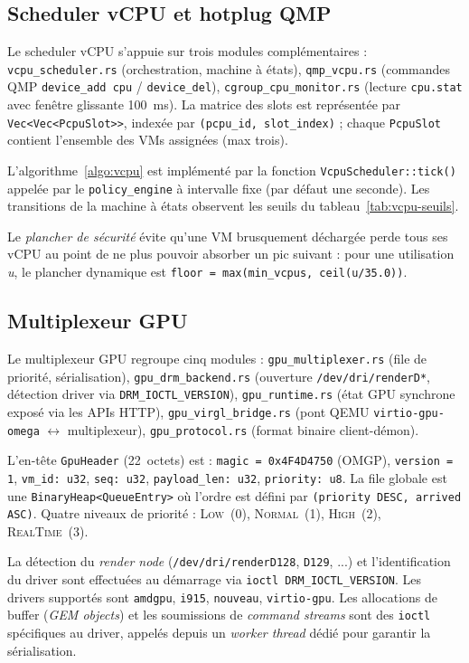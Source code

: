 \subsection{Scheduler vCPU et hotplug QMP}

Le scheduler vCPU s'appuie sur trois modules complémentaires : \texttt{vcpu\_scheduler.rs} (orchestration, machine à états), \texttt{qmp\_vcpu.rs} (commandes QMP \texttt{device\_add cpu} / \texttt{device\_del}), \texttt{cgroup\_cpu\_monitor.rs} (lecture \texttt{cpu.stat} avec fenêtre glissante 100~ms). La matrice des slots est représentée par \texttt{Vec<Vec<PcpuSlot>>}, indexée par \texttt{(pcpu\_id, slot\_index)} ; chaque \texttt{PcpuSlot} contient l'ensemble des VMs assignées (max trois).

L'algorithme~\ref{algo:vcpu} est implémenté par la fonction \texttt{VcpuScheduler::tick()} appelée par le \texttt{policy\_engine} à intervalle fixe (par défaut une seconde). Les transitions de la machine à états observent les seuils du tableau~\ref{tab:vcpu-seuils}.

Le \emph{plancher de sécurité} évite qu'une VM brusquement déchargée perde tous ses vCPU au point de ne plus pouvoir absorber un pic suivant : pour une utilisation \emph{u}, le plancher dynamique est \texttt{floor = max(min\_vcpus, ceil(u/35.0))}.

\subsection{Multiplexeur GPU}

Le multiplexeur GPU regroupe cinq modules : \texttt{gpu\_multiplexer.rs} (file de priorité, sérialisation), \texttt{gpu\_drm\_backend.rs} (ouverture \texttt{/dev/dri/renderD*}, détection driver via \texttt{DRM\_IOCTL\_VERSION}), \texttt{gpu\_runtime.rs} (état GPU synchrone exposé via les APIs HTTP), \texttt{gpu\_virgl\_bridge.rs} (pont QEMU \texttt{virtio-gpu-omega} $\leftrightarrow$ multiplexeur), \texttt{gpu\_protocol.rs} (format binaire client-démon).

L'en-tête \texttt{GpuHeader} (22~octets) est : \texttt{magic = 0x4F4D4750} (\og{}OMGP\fg{}), \texttt{version = 1}, \texttt{vm\_id: u32}, \texttt{seq: u32}, \texttt{payload\_len: u32}, \texttt{priority: u8}. La file globale est une \texttt{BinaryHeap<QueueEntry>} où l'ordre est défini par \texttt{(priority DESC, arrived ASC)}. Quatre niveaux de priorité : \textsc{Low}~(0), \textsc{Normal}~(1), \textsc{High}~(2), \textsc{RealTime}~(3).

La détection du \emph{render node} (\texttt{/dev/dri/renderD128}, \texttt{D129}, ...) et l'identification du driver sont effectuées au démarrage via \texttt{ioctl DRM\_IOCTL\_VERSION}. Les drivers supportés sont \texttt{amdgpu}, \texttt{i915}, \texttt{nouveau}, \texttt{virtio-gpu}. Les allocations de buffer (\emph{GEM objects}) et les soumissions de \emph{command streams} sont des \texttt{ioctl} spécifiques au driver, appelés depuis un \emph{worker thread} dédié pour garantir la sérialisation.

